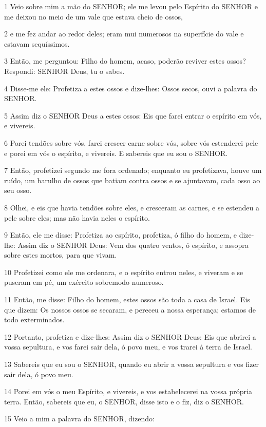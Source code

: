 \par 1 Veio sobre mim a mão do SENHOR; ele me levou pelo Espírito do SENHOR e me deixou no meio de um vale que estava cheio de ossos,
\par 2 e me fez andar ao redor deles; eram mui numerosos na superfície do vale e estavam sequíssimos.
\par 3 Então, me perguntou: Filho do homem, acaso, poderão reviver estes ossos? Respondi: SENHOR Deus, tu o sabes.
\par 4 Disse-me ele: Profetiza a estes ossos e dize-lhes: Ossos secos, ouvi a palavra do SENHOR.
\par 5 Assim diz o SENHOR Deus a estes ossos: Eis que farei entrar o espírito em vós, e vivereis.
\par 6 Porei tendões sobre vós, farei crescer carne sobre vós, sobre vós estenderei pele e porei em vós o espírito, e vivereis. E sabereis que eu sou o SENHOR.
\par 7 Então, profetizei segundo me fora ordenado; enquanto eu profetizava, houve um ruído, um barulho de ossos que batiam contra ossos e se ajuntavam, cada osso ao seu osso.
\par 8 Olhei, e eis que havia tendões sobre eles, e cresceram as carnes, e se estendeu a pele sobre eles; mas não havia neles o espírito.
\par 9 Então, ele me disse: Profetiza ao espírito, profetiza, ó filho do homem, e dize-lhe: Assim diz o SENHOR Deus: Vem dos quatro ventos, ó espírito, e assopra sobre estes mortos, para que vivam.
\par 10 Profetizei como ele me ordenara, e o espírito entrou neles, e viveram e se puseram em pé, um exército sobremodo numeroso.
\par 11 Então, me disse: Filho do homem, estes ossos são toda a casa de Israel. Eis que dizem: Os nossos ossos se secaram, e pereceu a nossa esperança; estamos de todo exterminados.
\par 12 Portanto, profetiza e dize-lhes: Assim diz o SENHOR Deus: Eis que abrirei a vossa sepultura, e vos farei sair dela, ó povo meu, e vos trarei à terra de Israel.
\par 13 Sabereis que eu sou o SENHOR, quando eu abrir a vossa sepultura e vos fizer sair dela, ó povo meu.
\par 14 Porei em vós o meu Espírito, e vivereis, e vos estabelecerei na vossa própria terra. Então, sabereis que eu, o SENHOR, disse isto e o fiz, diz o SENHOR.
\par 15 Veio a mim a palavra do SENHOR, dizendo:
